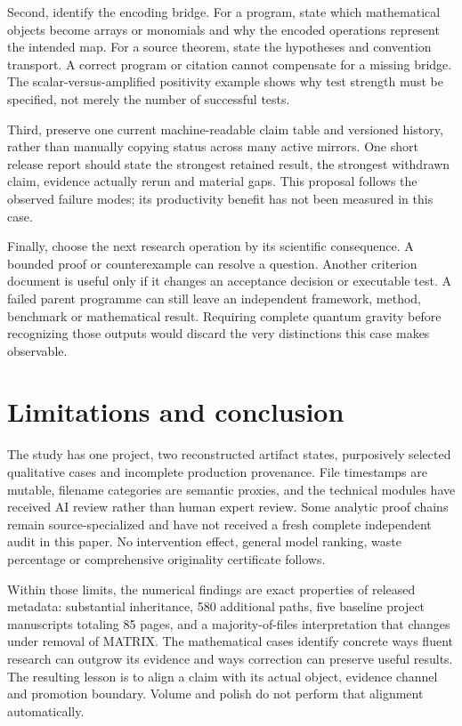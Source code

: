 \documentclass[11pt,a4paper]{article}
\begin{document}
Second, identify the encoding bridge. For a program, state which mathematical
objects become arrays or monomials and why the encoded operations represent
the intended map. For a source theorem, state the hypotheses and convention
transport. A correct program or citation cannot compensate for a missing
bridge. The scalar-versus-amplified positivity example shows why test strength
must be specified, not merely the number of successful tests.

Third, preserve one current machine-readable claim table and versioned
history, rather than manually copying status across many active mirrors.
One short release report should state the strongest retained result, the
strongest withdrawn claim, evidence actually rerun and material gaps. This
proposal follows the observed failure modes; its productivity benefit has
not been measured in this case.

Finally, choose the next research operation by its scientific consequence.
A bounded proof or counterexample can resolve a question. Another criterion
document is useful only if it changes an acceptance decision or executable
test. A failed parent programme can still leave an independent framework,
method, benchmark or mathematical result. Requiring complete quantum gravity
before recognizing those outputs would discard the very distinctions this
case makes observable.

\section{Limitations and conclusion}
The study has one project, two reconstructed artifact states, purposively
selected qualitative cases and incomplete production provenance. File
timestamps are mutable, filename categories are semantic proxies, and the
technical modules have received AI review rather than human expert review.
Some analytic proof chains remain source-specialized and have not received
a fresh complete independent audit in this paper. No intervention effect,
general model ranking, waste percentage or comprehensive originality
certificate follows.

Within those limits, the numerical findings are exact properties of released
metadata: substantial inheritance, 580 additional paths, five baseline
project manuscripts totaling 85 pages, and a majority-of-files interpretation
that changes under removal of MATRIX. The mathematical cases identify
concrete ways fluent research can outgrow its evidence and ways correction
can preserve useful results. The resulting lesson is to align a claim with
its actual object, evidence channel and promotion boundary. Volume and
polish do not perform that alignment automatically.
\end{document}
